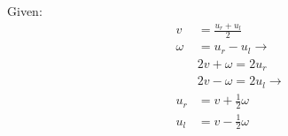 Given:
 \begin{align*}
  v&=\frac{u_r+u_l}{2}\\
 \omega&=u_r-u_l \rightarrow\\
 &2v+\omega=2u_r\\
 &2v-\omega=2u_l\rightarrow \\
 u_r&=v+\frac{1}{2}\omega\\
 u_l&=v-\frac{1}{2}\omega
 \end{align*}
 